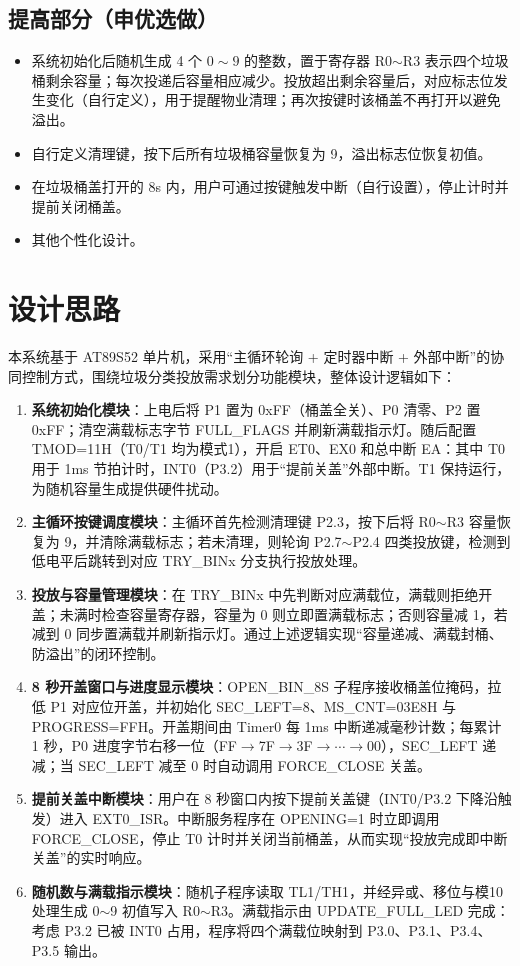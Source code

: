 \documentclass[12pt,a4paper]{article}
\begin{document}
\subsection{提高部分（申优选做）}
\begin{itemize}
    \item 系统初始化后随机生成 4 个 $0\sim9$ 的整数，置于寄存器 R0$\sim$R3 表示四个垃圾桶剩余容量；每次投递后容量相应减少。投放超出剩余容量后，对应标志位发生变化（自行定义），用于提醒物业清理；再次按键时该桶盖不再打开以避免溢出。
    \item 自行定义清理键，按下后所有垃圾桶容量恢复为 9，溢出标志位恢复初值。
    \item 在垃圾桶盖打开的 8s 内，用户可通过按键触发中断（自行设置），停止计时并提前关闭桶盖。
    \item 其他个性化设计。
\end{itemize}

\section{设计思路}
本系统基于 AT89S52 单片机，采用“主循环轮询 + 定时器中断 + 外部中断”的协同控制方式，围绕垃圾分类投放需求划分功能模块，整体设计逻辑如下：
\begin{enumerate}
    \item \textbf{系统初始化模块}：上电后将 P1 置为 0xFF（桶盖全关）、P0 清零、P2 置 0xFF；清空满载标志字节 FULL\_FLAGS 并刷新满载指示灯。随后配置 TMOD=11H（T0/T1 均为模式1），开启 ET0、EX0 和总中断 EA：其中 T0 用于 1ms 节拍计时，INT0（P3.2）用于“提前关盖”外部中断。T1 保持运行，为随机容量生成提供硬件扰动。
    \item \textbf{主循环按键调度模块}：主循环首先检测清理键 P2.3，按下后将 R0$\sim$R3 容量恢复为 9，并清除满载标志；若未清理，则轮询 P2.7$\sim$P2.4 四类投放键，检测到低电平后跳转到对应 TRY\_BINx 分支执行投放处理。
    \item \textbf{投放与容量管理模块}：在 TRY\_BINx 中先判断对应满载位，满载则拒绝开盖；未满时检查容量寄存器，容量为 0 则立即置满载标志；否则容量减 1，若减到 0 同步置满载并刷新指示灯。通过上述逻辑实现“容量递减、满载封桶、防溢出”的闭环控制。
    \item \textbf{8 秒开盖窗口与进度显示模块}：OPEN\_BIN\_8S 子程序接收桶盖位掩码，拉低 P1 对应位开盖，并初始化 SEC\_LEFT=8、MS\_CNT=03E8H 与 PROGRESS=FFH。开盖期间由 Timer0 每 1ms 中断递减毫秒计数；每累计 1 秒，P0 进度字节右移一位（FF$\rightarrow$7F$\rightarrow$3F$\rightarrow\cdots\rightarrow$00），SEC\_LEFT 递减；当 SEC\_LEFT 减至 0 时自动调用 FORCE\_CLOSE 关盖。
    \item \textbf{提前关盖中断模块}：用户在 8 秒窗口内按下提前关盖键（INT0/P3.2 下降沿触发）进入 EXT0\_ISR。中断服务程序在 OPENING=1 时立即调用 FORCE\_CLOSE，停止 T0 计时并关闭当前桶盖，从而实现“投放完成即中断关盖”的实时响应。
    \item \textbf{随机数与满载指示模块}：随机子程序读取 TL1/TH1，并经异或、移位与模10处理生成 0$\sim$9 初值写入 R0$\sim$R3。满载指示由 UPDATE\_FULL\_LED 完成：考虑 P3.2 已被 INT0 占用，程序将四个满载位映射到 P3.0、P3.1、P3.4、P3.5 输出。
\end{enumerate}
\end{document}
